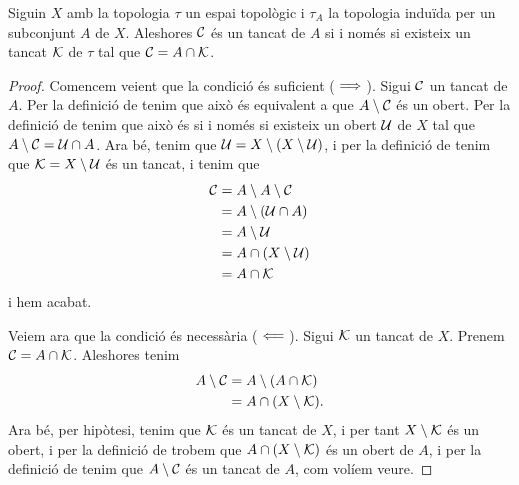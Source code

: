 \documentclass[../../Main.tex]{subfiles}
\begin{document}
	\begin{proposition}
		\label{prop:C és un tancat si i només si existeix un tancat K tal que l'intersecció de A i K és C}
		Siguin \(X\) amb la topologia \(\tau\) un espai topològic i \(\tau_{A}\) la topologia induïda per un subconjunt \(A\) de \(X\). Aleshores \(\mathcal{C}\) és un tancat de \(A\) si i només si existeix un tancat \(\mathcal{K}\) de \(\tau\) tal que \(\mathcal{C}=A\cap\mathcal{K}\).
		\begin{proof}
			Comencem veient que la condició és suficient (\(\implies\)). Sigui \(\mathcal{C}\) un tancat de \(A\). Per la definició de  tenim que això és equivalent a que \(A\setminus\mathcal{C}\) és un obert. Per la definició de  tenim que això és si i només si existeix un obert \(\mathcal{U}\) de \(X\) tal que \(A\setminus\mathcal{C}=\mathcal{U}\cap A\). Ara bé, tenim que \(\mathcal{U}=X\setminus(X\setminus\mathcal{U})\), i per la definició de  tenim que \(\mathcal{K}=X\setminus\mathcal{U}\) és un tancat, i tenim que
			\begin{align*}
				\mathcal{C}&=A\setminus A\setminus\mathcal{C} \\
				&=A\setminus(\mathcal{U}\cap A) \\
				&=A\setminus\mathcal{U} \\
				&=A\cap(X\setminus\mathcal{U}) \\
				&=A\cap\mathcal{K}
			\end{align*}
			i hem acabat.
			
			Veiem ara que la condició és necessària (\(\impliedby\)). Sigui \(\mathcal{K}\) un tancat de \(X\). Prenem \(\mathcal{C}=A\cap\mathcal{K}\). Aleshores tenim
			\begin{align*}
				A\setminus\mathcal{C}&=A\setminus(A\cap\mathcal{K}) \\
				&=A\cap(X\setminus\mathcal{K}).
			\end{align*}
			Ara bé, per hipòtesi, tenim que \(\mathcal{K}\) és un tancat de \(X\), i per tant \(X\setminus\mathcal{K}\) és un obert, i per la definició de  trobem que \(A\cap(X\setminus\mathcal{K})\) és un obert de \(A\), i per la definició de  tenim que \(A\setminus\mathcal{C}\) és un tancat de \(A\), com volíem veure.
		\end{proof}
	\end{proposition}
\end{document}
